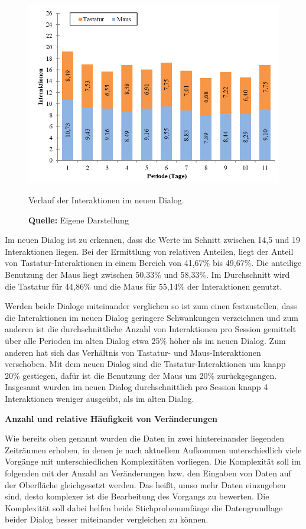 \begin{figure}[H]
  \centering
  \includegraphics[]{img/Interaktionen_Neuer_Dialog.png}
  \caption{Verlauf der Interaktionen im neuen Dialog.}
  \caption*{\textbf{Quelle:} Eigene Darstellung}
  \label{fig:verlaufInteraktionenNeuerDialog}
\end{figure}
Im neuen Dialog ist zu erkennen, dass die Werte im Schnitt zwischen 14,5 und 19 Interaktionen liegen. Bei der Ermittlung von relativen Anteilen, liegt der Anteil von Tastatur-Interaktionen in einem Bereich von 41,67\% bis 49,67\%. Die anteilige Benutzung der Maus liegt zwischen 50,33\% und 58,33\%. Im Durchschnitt wird die Tastatur für 44,86\% und die Maus für 55,14\% der Interaktionen genutzt.

Werden beide Dialoge miteinander verglichen so ist zum einen festzustellen, dass die Interaktionen im neuen Dialog geringere Schwankungen verzeichnen und zum anderen ist die durchschnittliche Anzahl von Interaktionen pro Session gemittelt über alle Perioden im alten Dialog etwa 25\% höher als im neuen Dialog. Zum anderen hat sich das Verhältnis von Tastatur- und Maus-Interaktionen verschoben. Mit dem neuen Dialog sind die Tastatur-Interaktionen um knapp 20\% gestiegen, dafür ist die Benutzung der Maus um 20\% zurückgegangen. Insgesamt wurden im neuen Dialog durchschnittlich pro Session knapp 4 Interaktionen weniger ausgeübt, als im alten Dialog.

\textbf{Anzahl und relative Häufigkeit von Veränderungen}

Wie bereits oben genannt wurden die Daten in zwei hintereinander liegenden Zeiträumen erhoben, in denen je nach aktuellem Aufkommen unterschiedlich viele Vorgänge mit unterschiedlichen Komplexitäten vorliegen. Die Komplexität soll im folgenden mit der Anzahl an Veränderungen bzw. den Eingaben von Daten auf der Oberfläche gleichgesetzt werden. Das heißt, umso mehr Daten einzugeben sind, desto komplexer ist die Bearbeitung des Vorgangs zu bewerten. Die Komplexität soll dabei helfen beide Stichprobenumfänge die Datengrundlage beider Dialog besser miteinander vergleichen zu können.

